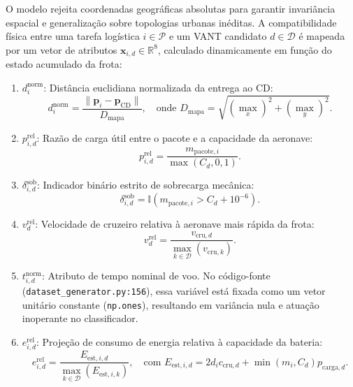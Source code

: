 O modelo rejeita coordenadas geográficas absolutas para garantir invariância espacial e generalização sobre topologias urbanas inéditas. A compatibilidade física entre uma tarefa logística $i \in \mathcal{P}$ e um VANT candidato $d \in \mathcal{D}$ é mapeada por um vetor de atributos $\mathbf{x}_{i, d} \in \mathbb{R}^8$, calculado dinamicamente em função do estado acumulado da frota:
\begin{enumerate}
    \item $d^{\text{norm}}_i$: Distância euclidiana normalizada da entrega ao CD:
    \begin{equation}\label{eq:feat_dist}
    d^{\text{norm}}_i = \frac{\|\mathbf{p}_i - \mathbf{p}_{\text{CD}}\|}{D_{\text{mapa}}}, \quad \text{onde } D_{\text{mapa}} = \sqrt{(\max_x)^2 + (\max_y)^2}.
    \end{equation}
    \item $p^{\text{rel}}_{i, d}$: Razão de carga útil entre o pacote e a capacidade da aeronave:
    \begin{equation}\label{eq:feat_peso}
    p^{\text{rel}}_{i, d} = \frac{m_{\text{pacote}, i}}{\max(C_d, 0{,}1)}.
    \end{equation}
    \item $\delta^{\text{sob}}_{i, d}$: Indicador binário estrito de sobrecarga mecânica:
    \begin{equation}\label{eq:feat_sobrecarga}
    \delta^{\text{sob}}_{i, d} = \mathbb{I}(m_{\text{pacote}, i} > C_d + 10^{-6}).
    \end{equation}
    \item $v^{\text{rel}}_d$: Velocidade de cruzeiro relativa à aeronave mais rápida da frota:
    \begin{equation}\label{eq:feat_vel}
    v^{\text{rel}}_d = \frac{v_{\text{cru}, d}}{\max_{k \in \mathcal{D}}(v_{\text{cru}, k})}.
    \end{equation}
    \item $t^{\text{norm}}_{i, d}$: Atributo de tempo nominal de voo. No código-fonte (\texttt{dataset\_generator.py:156}), essa variável está fixada como um vetor unitário constante (\texttt{np.ones}), resultando em variância nula e atuação inoperante no classificador.
    \item $e^{\text{rel}}_{i, d}$: Projeção de consumo de energia relativa à capacidade da bateria:
    \begin{equation}\label{eq:feat_energia}
    e^{\text{rel}}_{i, d} = \frac{E_{\text{est}, i, d}}{\max_{k \in \mathcal{D}}(E_{\text{est}, i, k})}, \quad \text{com } E_{\text{est}, i, d} = 2 d_i c_{\text{cru}, d} + \min(m_i, C_d) p_{\text{carga}, d}.

\end{equation}
\end{enumerate}
